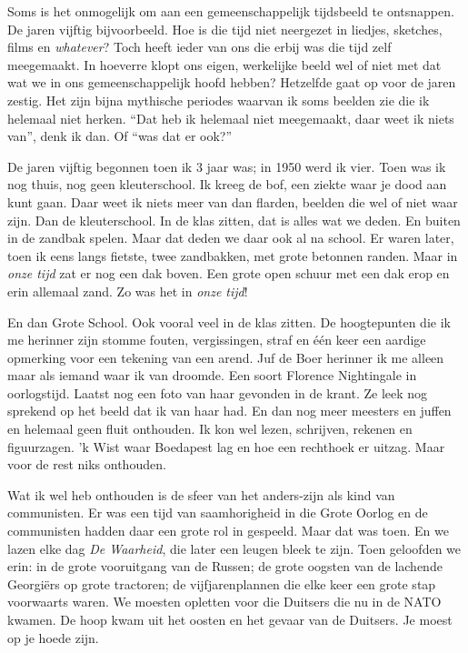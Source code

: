\documentclass[10pt,twoside,openright]{memoir}
\begin{document}
Soms is het onmogelijk om aan een gemeenschappelijk tijdsbeeld te ontsnappen. De jaren vijftig bijvoorbeeld. Hoe is die tijd niet neergezet in liedjes, sketches, films en \emph{whatever}? Toch heeft ieder van ons die erbij was die tijd zelf meegemaakt. In hoeverre klopt ons eigen, werkelijke beeld wel of niet met dat wat we in ons gemeenschappelijk hoofd hebben? Hetzelfde gaat op voor de jaren zestig. Het zijn bijna mythische periodes waarvan ik soms beelden zie die ik helemaal niet herken. ``Dat heb ik helemaal niet meegemaakt, daar weet ik niets van'', denk ik dan. Of ``was dat er ook?''

De jaren vijftig begonnen toen ik 3 jaar was; in 1950 werd ik vier. Toen was ik nog thuis, nog geen kleuterschool. Ik kreeg de bof, een ziekte waar je dood aan kunt gaan. Daar weet ik niets meer van dan flarden, beelden die wel of niet waar zijn. Dan de kleuterschool. In de klas zitten, dat is alles wat we deden. En buiten in de zandbak spelen. Maar dat deden we daar ook al na school. Er waren later, toen ik eens langs fietste, twee zandbakken, met grote betonnen randen. Maar in \emph{onze tijd} zat er nog een dak boven. Een grote open schuur met een dak erop en erin allemaal zand. Zo was het in \emph{onze tijd}!

En dan Grote School. Ook vooral veel in de klas zitten. De hoogtepunten die ik me herinner zijn stomme fouten, vergissingen, straf en één keer een aardige opmerking voor een tekening van een arend. Juf de Boer herinner ik me alleen maar als iemand waar ik van droomde. Een soort Florence Nightingale in oorlogstijd. Laatst nog een foto van haar gevonden in de krant. Ze leek nog sprekend op het beeld dat ik van haar had. En dan nog meer meesters en juffen en helemaal geen fluit onthouden. Ik kon wel lezen, schrijven, rekenen en figuurzagen. 'k Wist waar Boedapest lag en hoe een rechthoek er uitzag. Maar voor de rest niks onthouden.

Wat ik wel heb onthouden is de sfeer van het anders-zijn als kind van communisten. Er was een tijd van saamhorigheid in die Grote Oorlog en de communisten hadden daar een grote rol in gespeeld. Maar dat was toen. En we lazen elke dag \emph{De Waarheid}, die later een leugen bleek te zijn. Toen geloofden we erin: in de grote vooruitgang van de Russen; de grote oogsten van de lachende Georgiërs op grote tractoren; de vijfjarenplannen die elke keer een grote stap voorwaarts waren. We moesten opletten voor die Duitsers die nu in de NATO kwamen. De hoop kwam uit het oosten en het gevaar van de Duitsers. Je moest op je hoede zijn.
\end{document}
